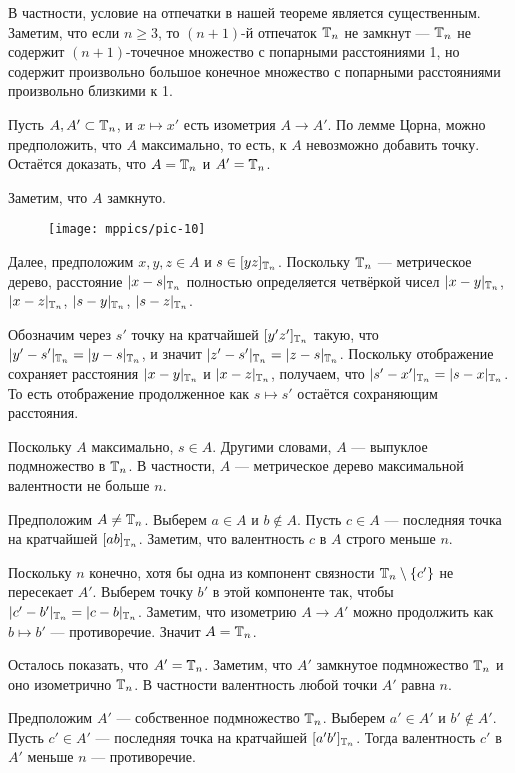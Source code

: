 \documentclass[a4paper,10pt]{article}
\begin{document}
В частности, условие на отпечатки в нашей теореме является существенным.
Заметим, что если $n\ge 3$, то $(n+1)$-й отпечаток $\mathbb{T}_n$ не замкнут --- $\mathbb{T}_n$ не содержит $(n+1)$-точечное множество с попарными расстояниями 1, 
но содержит произвольно большое конечное множество с  попарными расстояниями произвольно близкими к 1.


Пусть $A, A'\subset \mathbb{T}_n$, и $x\mapsto x'$ есть изометрия $A\to A'$.
По лемме Цорна, можно предположить, что $A$ максимально,
то есть, к $A$ невозможно добавить точку.
Остаётся доказать, что $A=\mathbb{T}_n$ и $A'=\mathbb{T}_n$.

Заметим, что $A$ замкнуто.

\begin{wrapfigure}{o}{23 mm}
\vskip-6mm
\centering
\texttt{[image: mppics/pic-10]}
\end{wrapfigure}

Далее, предположим $x,y,z\in A$ и $s\in [yz]_{\mathbb{T}_n}$.
Поскольку $\mathbb{T}_n$ --- метрическое дерево, расстояние $|x-s|_{\mathbb{T}_n}$ полностью определяется четвёркой чисел 
$|x-y|_{\mathbb{T}_n}$, $|x-z|_{\mathbb{T}_n}$, $|s-y|_{\mathbb{T}_n}$, $|s-z|_{\mathbb{T}_n}$.

Обозначим через $s'$ точку на кратчайшей $[y'z']_{\mathbb{T}_n}$ такую, что $|y'-s'|_{\TT_n}\z=|y-s|_{\TT_n}$, и значит $|z'-s'|_{\mathbb{T}_n}=|z-s|_{\mathbb{T}_n}$.
Поскольку отображение сохраняет расстояния $|x-y|_{\mathbb{T}_n}$ и $|x-z|_{\mathbb{T}_n}$,
получаем, что $|s'-x'|_{\mathbb{T}_n}=|s-x|_{\mathbb{T}_n}$.
То есть отображение продолженное как $s\mapsto s'$ остаётся сохраняющим расстояния.

Поскольку $A$ максимально, $s\in A$.
Другими словами, $A$ --- выпуклое подмножество в $\mathbb{T}_n$.
В частности, $A$ --- метрическое дерево максимальной валентности не больше $n$.

Предположим $A\ne \mathbb{T}_n$.
Выберем $a\in A$ и $b\notin A$.
Пусть $c\in A$ --- последняя точка на кратчайшей $[ab]_{\mathbb{T}_n}$.
Заметим, что валентность $c$ в $A$ строго меньше $n$.

Поскольку $n$ конечно, хотя бы одна из компонент связности $\TT_n\z\setminus \{c'\}$ не пересекает $A'$.
Выберем точку $b'$ в этой компоненте так, чтобы $|c'-b'|_{\TT_n}\z=|c-b|_{\TT_n}$.
Заметим, что изометрию $A\to A'$ можно продолжить как $b\mapsto b'$ --- противоречие.
Значит $A=\mathbb{T}_n$.

Осталось показать, что $A'=\mathbb{T}_n$.
Заметим, что $A'$ замкнутое подмножество $\mathbb{T}_n$ и оно изометрично $\mathbb{T}_n$.
В частности валентность любой точки $A'$ равна $n$.

Предположим $A'$ --- собственное подмножество $\mathbb{T}_n$.
Выберем $a'\in A'$ и $b'\notin A'$.
Пусть $c'\in A'$ --- последняя точка на кратчайшей $[a'b']_{\mathbb{T}_n}$.
Тогда валентность $c'$ в $A'$ меньше $n$ --- противоречие.
\qeds
\end{document}
